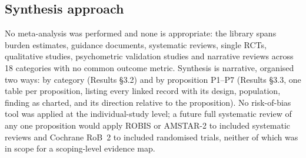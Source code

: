 \documentclass[11pt]{article}
\begin{document}
\subsection{Synthesis approach}
No meta-analysis was performed and none is appropriate: the library spans burden estimates,
guidance documents, systematic reviews, single RCTs, qualitative studies, psychometric validation
studies and narrative reviews across 18 categories with no common outcome metric. Synthesis is
narrative, organised two ways: by category (Results \S3.2) and by proposition P1--P7 (Results
\S3.3, one table per proposition, listing every linked record with its design, population, finding
as charted, and its direction relative to the proposition). No risk-of-bias tool was applied at
the individual-study level; a future full systematic review of any one proposition would apply
ROBIS or AMSTAR-2 to included systematic reviews and Cochrane RoB~2 to included randomised trials,
neither of which was in scope for a scoping-level evidence map.
\end{document}
